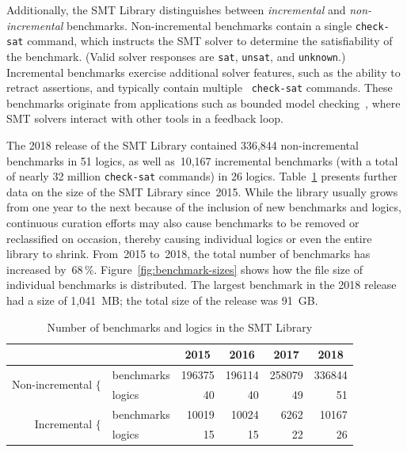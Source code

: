 \documentclass[dvipsnames,table,twoside,11pt]{article}
\begin{document}
Additionally, the SMT Library distinguishes between \emph{incremental}
and \emph{non-incremental} benchmarks.  Non-incremental benchmarks
contain a single {\tt check-sat} command, which instructs the SMT
solver to determine the satisfiability of the benchmark.  (Valid
solver responses are {\tt sat}, {\tt unsat}, and {\tt unknown}.)
Incremental benchmarks exercise additional solver features, such as
the ability to retract assertions, and typically contain multiple {\tt
  check-sat} commands.  These benchmarks originate from applications
such as bounded model
checking~\cite{Gunther:2014:IBS:2632362.2632374}, where SMT solvers
interact with other tools in a feedback loop.

The 2018 release of the SMT Library contained 336,844 non-incremental
benchmarks in 51 logics, as well as~10,167 incremental benchmarks
(with a total of nearly 32 million {\tt check-sat} commands) in 26
logics.  Table~\ref{table:smtlib} presents further data on the size of
the SMT Library since~2015.  While the library usually grows from one
year to the next because of the inclusion of new benchmarks and
logics, continuous curation efforts may also cause benchmarks to be
removed or reclassified on occasion, thereby causing individual logics
or even the entire library to shrink.  From~2015 to~2018, the total
number of benchmarks has increased by~68\,\%.
Figure~\ref{fig:benchmark-sizes} shows how the file size of individual
benchmarks is distributed.  The largest benchmark in the 2018 release
had a size of 1,041~MB; the total size of the release was 91~GB.

\begin{table}
  \caption{Number of benchmarks and logics in the SMT Library}
  \label{table:smtlib}
  \centering
  \begin{tabular}{r@{\ \ }lrrrr}
    \toprule
                               & & \multicolumn{1}{c}{2015} & \multicolumn{1}{c}{2016} & \multicolumn{1}{c}{2017} & \multicolumn{1}{c}{2018} \\
    \midrule
    \multirow{2}{*}{Non-incremental $\{$} & benchmarks & 196375 & 196114 & 258079 & 336844 \\
                                          & logics     &     40 &     40 &     49 &     51 \\
    \multirow{2}{*}{Incremental $\{$}     & benchmarks &  10019 &  10024 &   6262 &  10167 \\
                                          & logics     &     15 &     15 &     22 &     26 \\
    \bottomrule
  \end{tabular}
\end{table}
\end{document}
